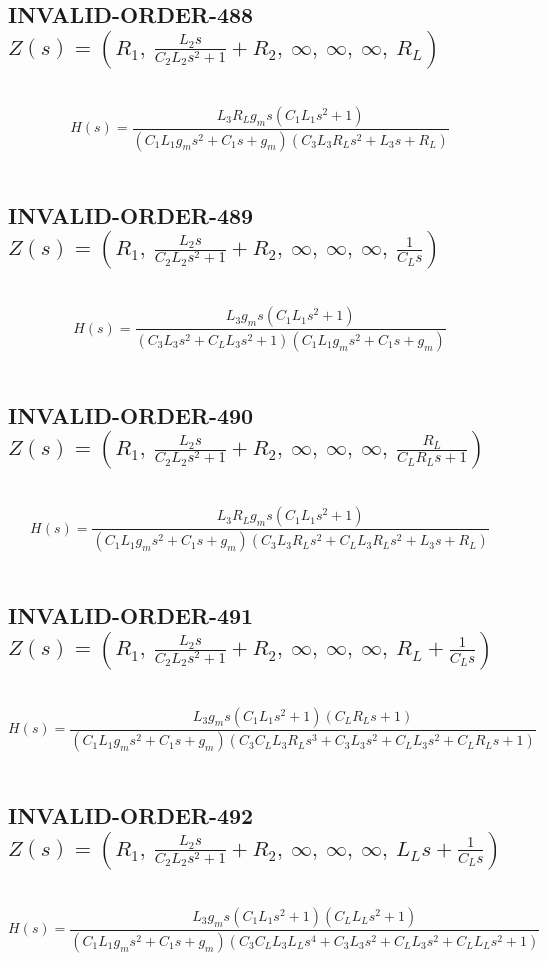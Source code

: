 \documentclass{article}
\begin{document}
\subsection{INVALID-ORDER-488 $Z(s) = \left( R_{1}, \  \frac{L_{2} s}{C_{2} L_{2} s^{2} + 1} + R_{2}, \  \infty, \  \infty, \  \infty, \  R_{L}\right)$ } \ 
\textbf{\[H(s) = \frac{L_{3} R_{L} g_{m} s \left(C_{1} L_{1} s^{2} + 1\right)}{\left(C_{1} L_{1} g_{m} s^{2} + C_{1} s + g_{m}\right) \left(C_{3} L_{3} R_{L} s^{2} + L_{3} s + R_{L}\right)}\] } \ 
\subsection{INVALID-ORDER-489 $Z(s) = \left( R_{1}, \  \frac{L_{2} s}{C_{2} L_{2} s^{2} + 1} + R_{2}, \  \infty, \  \infty, \  \infty, \  \frac{1}{C_{L} s}\right)$ } \ 
\textbf{\[H(s) = \frac{L_{3} g_{m} s \left(C_{1} L_{1} s^{2} + 1\right)}{\left(C_{3} L_{3} s^{2} + C_{L} L_{3} s^{2} + 1\right) \left(C_{1} L_{1} g_{m} s^{2} + C_{1} s + g_{m}\right)}\] } \ 
\subsection{INVALID-ORDER-490 $Z(s) = \left( R_{1}, \  \frac{L_{2} s}{C_{2} L_{2} s^{2} + 1} + R_{2}, \  \infty, \  \infty, \  \infty, \  \frac{R_{L}}{C_{L} R_{L} s + 1}\right)$ } \ 
\textbf{\[H(s) = \frac{L_{3} R_{L} g_{m} s \left(C_{1} L_{1} s^{2} + 1\right)}{\left(C_{1} L_{1} g_{m} s^{2} + C_{1} s + g_{m}\right) \left(C_{3} L_{3} R_{L} s^{2} + C_{L} L_{3} R_{L} s^{2} + L_{3} s + R_{L}\right)}\] } \ 
\subsection{INVALID-ORDER-491 $Z(s) = \left( R_{1}, \  \frac{L_{2} s}{C_{2} L_{2} s^{2} + 1} + R_{2}, \  \infty, \  \infty, \  \infty, \  R_{L} + \frac{1}{C_{L} s}\right)$ } \ 
\textbf{\[H(s) = \frac{L_{3} g_{m} s \left(C_{1} L_{1} s^{2} + 1\right) \left(C_{L} R_{L} s + 1\right)}{\left(C_{1} L_{1} g_{m} s^{2} + C_{1} s + g_{m}\right) \left(C_{3} C_{L} L_{3} R_{L} s^{3} + C_{3} L_{3} s^{2} + C_{L} L_{3} s^{2} + C_{L} R_{L} s + 1\right)}\] } \ 
\subsection{INVALID-ORDER-492 $Z(s) = \left( R_{1}, \  \frac{L_{2} s}{C_{2} L_{2} s^{2} + 1} + R_{2}, \  \infty, \  \infty, \  \infty, \  L_{L} s + \frac{1}{C_{L} s}\right)$ } \ 
\textbf{\[H(s) = \frac{L_{3} g_{m} s \left(C_{1} L_{1} s^{2} + 1\right) \left(C_{L} L_{L} s^{2} + 1\right)}{\left(C_{1} L_{1} g_{m} s^{2} + C_{1} s + g_{m}\right) \left(C_{3} C_{L} L_{3} L_{L} s^{4} + C_{3} L_{3} s^{2} + C_{L} L_{3} s^{2} + C_{L} L_{L} s^{2} + 1\right)}\] } \ 
\end{document}
